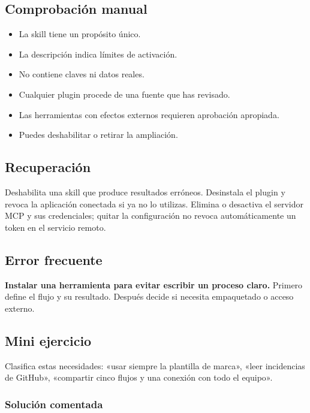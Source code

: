 \documentclass[10pt,a4paper,openany]{book}
\providecommand{\tightlist}{\setlength{\itemsep}{0.18em}\setlength{\parskip}{0pt}}
\begin{document}
\subsection{Comprobación manual}\label{comprobaciuxf3n-manual-11}

\begin{itemize}
\tightlist
\item
  La skill tiene un propósito único.
\item
  La descripción indica límites de activación.
\item
  No contiene claves ni datos reales.
\item
  Cualquier plugin procede de una fuente que has revisado.
\item
  Las herramientas con efectos externos requieren aprobación apropiada.
\item
  Puedes deshabilitar o retirar la ampliación.
\end{itemize}

\subsection{Recuperación}\label{recuperaciuxf3n-14}

Deshabilita una skill que produce resultados erróneos. Desinstala el
plugin y revoca la aplicación conectada si ya no lo utilizas. Elimina o
desactiva el servidor MCP y sus credenciales; quitar la configuración no
revoca automáticamente un token en el servicio remoto.

\subsection{Error frecuente}\label{error-frecuente-16}

\textbf{Instalar una herramienta para evitar escribir un proceso claro.}
Primero define el flujo y su resultado. Después decide si necesita
empaquetado o acceso externo.

\subsection{Mini ejercicio}\label{mini-ejercicio-12}

Clasifica estas necesidades: «usar siempre la plantilla de marca», «leer
incidencias de GitHub», «compartir cinco flujos y una conexión con todo
el equipo».

\subsubsection{Solución comentada}\label{soluciuxf3n-comentada-17}
\end{document}
